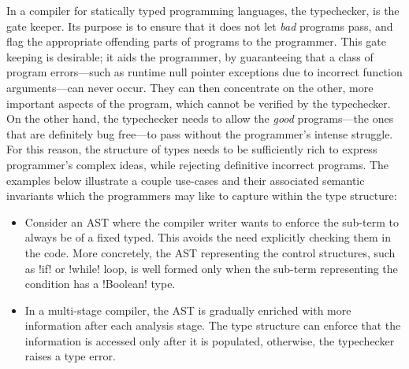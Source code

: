 \documentclass[screen,nonacm]{acmart}
\begin{document}
In a compiler for statically typed programming languages, the
typechecker, is the gate keeper. Its purpose is to ensure that it does
not let \emph{bad} programs pass, and flag the appropriate offending
parts of programs to the programmer. This gate keeping is desirable;
it aids the programmer, by guaranteeing that a class of program
errors---such as runtime null pointer exceptions due to incorrect
function arguments---can never occur. They can then concentrate on the
other, more important aspects of the program, which cannot be verified
by the typechecker. On the other hand, the typechecker needs to allow
the \emph{good} programs---the ones that are definitely bug free---to
pass without the programmer's intense struggle. For
this reason, the structure of types needs to be sufficiently rich
to express programmer's complex ideas, while rejecting definitive incorrect
programs. The examples below illustrate a couple use-cases and
their associated semantic invariants which the programmers may like to
capture within the type structure:
\begin{itemize}
\item Consider an AST where the compiler writer wants to enforce the
  sub-term to always be of a fixed typed. This avoids the need
  explicitly checking them in the code.
  More concretely, the AST representing the control structures, such
  as !if! or !while! loop, is well formed only when the sub-term
  representing the condition has a !Boolean! type.
\item In a multi-stage compiler, the AST is gradually enriched with
  more information after each analysis stage. The type structure can
  enforce that the information is accessed only after it is populated,
  otherwise, the typechecker raises a type error\cite{peyton_jones_trees_2017}.
\end{itemize}
\end{document}
